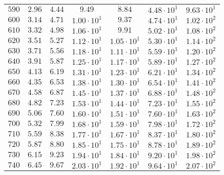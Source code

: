 \begin{table}[h]
\begin{tabular}{lcccccc}
$	590	$ & $	2.96 	$ & $	4.44 	$ & $	9.49 	$ & $	8.84 	$ & $	4.48 \cdot 10^{1} 	$ & $	9.63 \cdot 10^{1} 	 $ \\
$	600	$ & $	3.14 	$ & $	4.71 	$ & $	1.00 \cdot 10^{1} 	$ & $	9.37 	$ & $	4.74 \cdot 10^{1} 	$ & $	1.02 \cdot 10^{2} 	 $ \\
$	610	$ & $	3.32 	$ & $	4.98 	$ & $	1.06 \cdot 10^{1} 	$ & $	9.91 	$ & $	5.02 \cdot 10^{1} 	$ & $	1.08 \cdot 10^{2} 	 $ \\
$	620	$ & $	3.51 	$ & $	5.27 	$ & $	1.12 \cdot 10^{1} 	$ & $	1.05 \cdot 10^{1} 	$ & $	5.30 \cdot 10^{1} 	$ & $	1.14 \cdot 10^{2} 	 $ \\
$	630	$ & $	3.71 	$ & $	5.56 	$ & $	1.18 \cdot 10^{1} 	$ & $	1.11 \cdot 10^{1} 	$ & $	5.59 \cdot 10^{1} 	$ & $	1.20 \cdot 10^{2} 	 $ \\
$	640	$ & $	3.91 	$ & $	5.87 	$ & $	1.25 \cdot 10^{1} 	$ & $	1.17 \cdot 10^{1} 	$ & $	5.89 \cdot 10^{1} 	$ & $	1.27 \cdot 10^{2} 	 $ \\
$	650	$ & $	4.13 	$ & $	6.19 	$ & $	1.31 \cdot 10^{1} 	$ & $	1.23 \cdot 10^{1} 	$ & $	6.21 \cdot 10^{1} 	$ & $	1.34 \cdot 10^{2} 	 $ \\
$	660	$ & $	4.35 	$ & $	6.53 	$ & $	1.38 \cdot 10^{1} 	$ & $	1.30 \cdot 10^{1} 	$ & $	6.54 \cdot 10^{1} 	$ & $	1.41 \cdot 10^{2} 	 $ \\
$	670	$ & $	4.58 	$ & $	6.87 	$ & $	1.45 \cdot 10^{1} 	$ & $	1.37 \cdot 10^{1} 	$ & $	6.88 \cdot 10^{1} 	$ & $	1.48 \cdot 10^{2} 	 $ \\
$	680	$ & $	4.82 	$ & $	7.23 	$ & $	1.53 \cdot 10^{1} 	$ & $	1.44 \cdot 10^{1} 	$ & $	7.23 \cdot 10^{1} 	$ & $	1.55 \cdot 10^{2} 	 $ \\
$	690	$ & $	5.06 	$ & $	7.60 	$ & $	1.60 \cdot 10^{1} 	$ & $	1.51 \cdot 10^{1} 	$ & $	7.60 \cdot 10^{1} 	$ & $	1.63 \cdot 10^{2} 	 $ \\
$	700	$ & $	5.32 	$ & $	7.99 	$ & $	1.68 \cdot 10^{1} 	$ & $	1.59 \cdot 10^{1} 	$ & $	7.98 \cdot 10^{1} 	$ & $	1.72 \cdot 10^{2} 	 $ \\
$	710	$ & $	5.59 	$ & $	8.38 	$ & $	1.77 \cdot 10^{1} 	$ & $	1.67 \cdot 10^{1} 	$ & $	8.37 \cdot 10^{1} 	$ & $	1.80 \cdot 10^{2} 	 $ \\
$	720	$ & $	5.87 	$ & $	8.80 	$ & $	1.85 \cdot 10^{1} 	$ & $	1.75 \cdot 10^{1} 	$ & $	8.78 \cdot 10^{1} 	$ & $	1.89 \cdot 10^{2} 	 $ \\
$	730	$ & $	6.15 	$ & $	9.23 	$ & $	1.94 \cdot 10^{1} 	$ & $	1.84 \cdot 10^{1} 	$ & $	9.20 \cdot 10^{1} 	$ & $	1.98 \cdot 10^{2} 	 $ \\
$	740	$ & $	6.45 	$ & $	9.67 	$ & $	2.03 \cdot 10^{1} 	$ & $	1.92 \cdot 10^{1} 	$ & $	9.64 \cdot 10^{1} 	$ & $	2.07 \cdot 10^{2} 	 $ \\

\end{tabular}
\end{table}
